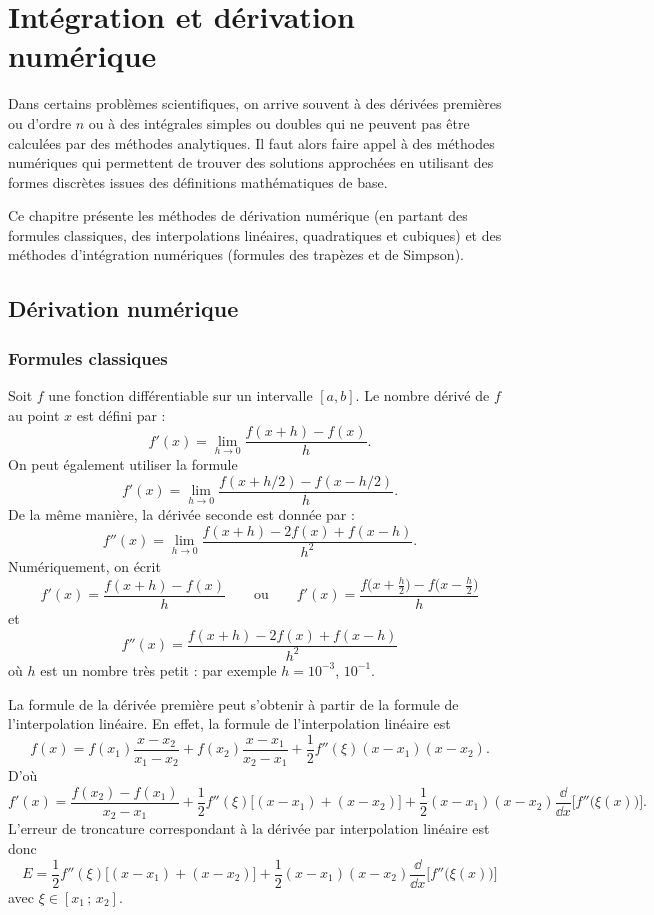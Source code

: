 \chapter{Intégration et dérivation numérique}

Dans certains problèmes scientifiques, on arrive souvent à des dérivées
premières ou d'ordre $n$ ou à des intégrales simples ou doubles qui ne peuvent
pas être calculées par des méthodes analytiques. Il faut alors faire appel à
des méthodes numériques qui permettent de trouver des solutions approchées en
utilisant des formes discrètes issues des définitions mathématiques de base.

Ce chapitre présente les méthodes de dérivation numérique (en partant des
formules classiques, des interpolations linéaires, quadratiques et cubiques)
et des méthodes d'intégration numériques (formules des trapèzes et de
Simpson).

\section{Dérivation numérique}

\subsection{Formules classiques}

Soit $f$ une fonction différentiable sur un intervalle $[a,b]$. Le nombre
dérivé de $f$ au point $x$ est défini par :
\[
  f'(x) = \lim_{h\to 0}\frac{f(x+h) - f(x)}{h} .
\]
On peut également utiliser la formule
\[
  f'(x) = \lim_{h\to 0}\frac{f(x + h/2) - f(x - h/2)}{h} .
\]
De la même manière, la dérivée seconde est donnée par :
\[
  f''(x) = \lim_{h\to 0}\frac{f(x+h) - 2f(x) + f(x-h)}{h^2} .
\]
Numériquement, on écrit
\[
  f'(x) = \frac{f(x+h) - f(x)}{h}
  \qquad\text{ou}\qquad
  f'(x) = \frac{f\bigl(x + \frac{h}{2}\bigr) - f\bigl(x - \frac{h}{2}\bigr)}{h}
\]
et
\[
  f''(x) = \frac{f(x+h) - 2f(x) + f(x-h)}{h^2}
\]
où $h$ est un nombre très petit : par exemple $h = 10^{-3}$, $10^{-1}$.

La formule de la dérivée première peut s'obtenir à partir de la formule de
l'interpolation linéaire. En effet, la formule de l'interpolation linéaire est
\[
  f(x) = f(x_1)\frac{x - x_2}{x_1 - x_2} + f(x_2)\frac{x - x_1}{x_2 - x_1}
       + \frac{1}{2}f''(\xi)(x - x_1)(x - x_2) .
\]
D'où
\[
  f'(x) = \frac{f(x_2) - f(x_1)}{x_2 - x_1}
        + \frac{1}{2}f''(\xi)\bigl[(x - x_1) + (x - x_2)\bigr]
        + \frac{1}{2}(x - x_1)(x - x_2)\frac{\dd}{\dd x}\bigl[f''\bigl(\xi(x)\bigr)\bigr] .
\]
L'erreur de troncature correspondant à la dérivée par interpolation linéaire
est donc
\[
  E = \frac{1}{2}f''(\xi)\bigl[(x - x_1) + (x - x_2)\bigr]
    + \frac{1}{2}(x - x_1)(x - x_2)\frac{\dd}{\dd x}\bigl[f''\bigl(\xi(x)\bigr)\bigr]
\]
avec $\xi \in [x_1\,;\,x_2]$.

